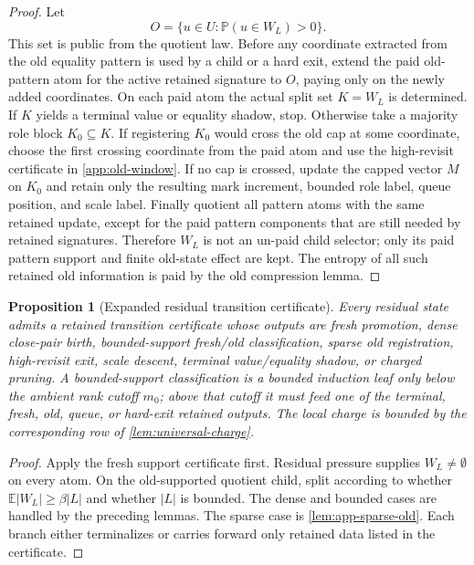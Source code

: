 \documentclass[11pt]{article}
\newcommand{\Cref}[1]{\ref{#1}}
\newtheorem{proposition}[theorem]{Proposition}
\theoremstyle{remark}
\newcommand{\E}{\mathbb E}
\newcommand{\Prob}{\mathbb P}
\begin{document}
\begin{proof}
Let
\[
        O=\{u\in U:\Prob(u\in W_L)>0\}.
\]
This set is public from the quotient law.  Before any coordinate extracted from the old equality pattern is used by a child or a hard exit, extend the paid old-pattern atom for the active retained signature to $O$, paying only on the newly added coordinates.  On each paid atom the actual split set $K=W_L$ is determined.  If $K$ yields a terminal value or equality shadow, stop.  Otherwise take a majority role block $K_0\subseteq K$.  If registering $K_0$ would cross the old cap at some coordinate, choose the first crossing coordinate from the paid atom and use the high-revisit certificate in \Cref{app:old-window}.  If no cap is crossed, update the capped vector $M$ on $K_0$ and retain only the resulting mark increment, bounded role label, queue position, and scale label.  Finally quotient all pattern atoms with the same retained update, except for the paid pattern components that are still needed by retained signatures.  Therefore $W_L$ is not an un-paid child selector; only its paid pattern support and finite old-state effect are kept.  The entropy of all such retained old information is paid by the old compression lemma.
\end{proof}

\begin{proposition}[Expanded residual transition certificate]\label{prop:app-residual-certificate}
Every residual state admits a retained transition certificate whose outputs are
fresh promotion, dense close-pair birth, bounded-support fresh/old
classification, sparse old registration, high-revisit exit, scale descent,
terminal value/equality shadow, or charged pruning.  A bounded-support
classification is a bounded induction leaf only below the ambient rank cutoff
$m_0$; above that cutoff it must feed one of the terminal, fresh, old, queue, or
hard-exit retained outputs.  The local charge is bounded by the corresponding
row of \Cref{lem:universal-charge}.
\end{proposition}

\begin{proof}
Apply the fresh support certificate first.  Residual pressure supplies $W_L\ne\emptyset$ on every atom.  On the old-supported quotient child, split according to whether $\E|W_L|\ge \beta |L|$ and whether $|L|$ is bounded.  The dense and bounded cases are handled by the preceding lemmas.  The sparse case is \Cref{lem:app-sparse-old}.  Each branch either terminalizes or carries forward only retained data listed in the certificate.
\end{proof}
\end{document}
